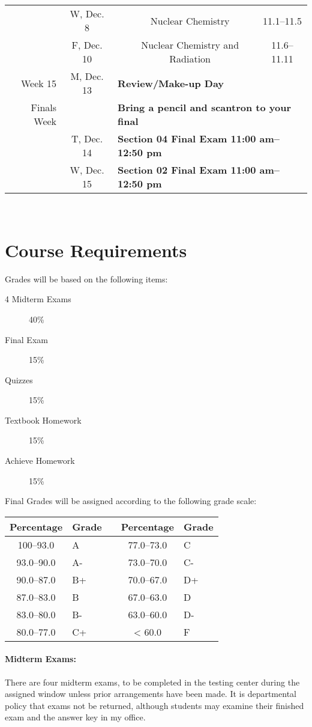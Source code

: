\documentclass[12pt, letterpaper]{article}
\begin{document}
\begin{tabular}{rcccc}
	& W, Dec. 8&& Nuclear Chemistry & 11.1--11.5\\
	& F, Dec. 10&& Nuclear Chemistry and Radiation & 11.6--11.11\\
	\midrule
	Week 15 & M, Dec. 13& \multicolumn{3}{l}{\textbf{Review/Make-up Day}}\\
	\midrule
	Finals Week & & \multicolumn{3}{l}{\textbf{Bring a pencil and scantron to your final}}\\
	& T, Dec. 14& \multicolumn{3}{l}{\textbf{Section 04 Final Exam 11:00 am--12:50 pm}}\\
	& W, Dec. 15& \multicolumn{3}{l}{\textbf{Section 02 Final Exam 11:00 am--12:50 pm}}\\
\end{tabular}

~

\section*{Course Requirements}
Grades will be based on the following items:
\begin{description}
  \item[4 Midterm Exams] 40\%
  \item[Final Exam] 15\%
  \item[Quizzes] 15\%
  \item[Textbook Homework] 15\%
  \item[Achieve Homework] 15\%
\end{description}
Final Grades will be assigned according to the following grade scale:

\begin{tabular}{cl|c|cl}
	Percentage & Grade &  & Percentage & Grade \\ \midrule
	100--93.0 & A     &  &  77.0--73.0 & C     \\
	93.0--90.0 & A-    &  &  73.0--70.0 & C-    \\
	90.0--87.0 & B+    &  &  70.0--67.0 & D+    \\
	87.0--83.0 & B     &  &  67.0--63.0 & D     \\
	83.0--80.0 & B-    &  &  63.0--60.0 & D-    \\
	80.0--77.0 & C+    &  &     < 60.0 & F
\end{tabular}
\paragraph{Midterm Exams:}
There are four midterm exams, to be completed in the testing center during the assigned window unless prior arrangements have been made. It is departmental policy that exams not be returned, although students may examine their finished exam and the answer key in my office.
\end{document}
